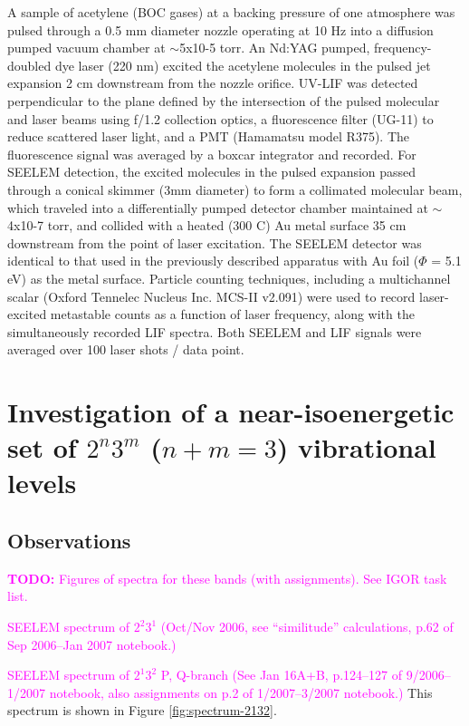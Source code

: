 \documentclass[12pt,draft]{mitthesis}
\newcommand{\TODO} [1]{\textcolor{magenta}{\textbf{TODO:} #1}}
\newcommand{\POINT}[1]{\textcolor{magenta}{#1}}
\begin{document}
A sample of acetylene (BOC gases) at a backing pressure of one
atmosphere was pulsed through a 0.5 mm diameter nozzle operating at 10
Hz into a diffusion pumped vacuum chamber at $\sim$5x10-5 torr.  An Nd:YAG
pumped, frequency-doubled dye laser (220 nm) excited the acetylene
molecules in the pulsed jet expansion 2 cm downstream from the nozzle
orifice. UV-LIF was detected perpendicular to the plane defined by the
intersection of the pulsed molecular and laser beams using f/1.2
collection optics, a fluorescence filter (UG-11) to reduce scattered
laser light, and a PMT (Hamamatsu model R375). The fluorescence signal
was averaged by a boxcar integrator and recorded. For SEELEM
detection, the excited molecules in the pulsed expansion passed
through a conical skimmer (3mm diameter) to form a collimated
molecular beam, which traveled into a differentially pumped detector
chamber maintained at $\sim$4x10-7 torr, and collided with a heated (300
C) Au metal surface 35 cm downstream from the point of laser
excitation. The SEELEM detector was identical to that used in the
previously described apparatus with Au foil ($\Phi$ = 5.1 eV) as the
metal surface.  Particle counting techniques, including a multichannel
scalar (Oxford Tennelec Nucleus Inc. MCS-II v2.091) were used to
record laser-excited metastable counts as a function of laser
frequency, along with the simultaneously recorded LIF spectra. Both
SEELEM and LIF signals were averaged over 100 laser shots / data
point.

\section{Investigation of a near-isoenergetic set of $2^n3^m$ ($n+m=3$)
  vibrational levels}

\subsection{Observations}

\TODO{Figures of spectra for these bands (with assignments). See IGOR
  task list.}

\POINT{SEELEM spectrum of $2^2 3^1$ (Oct/Nov 2006, see ``similitude''
  calculations, p.62 of Sep 2006--Jan 2007 notebook.)}

\POINT{SEELEM spectrum of $2^1 3^2$ P, Q-branch (See Jan 16A+B,
  p.124--127 of 9/2006--1/2007 notebook, also assignments on p.2 of
  1/2007--3/2007 notebook.)}  This spectrum is shown in Figure
\ref{fig:spectrum-2132}.
\end{document}
